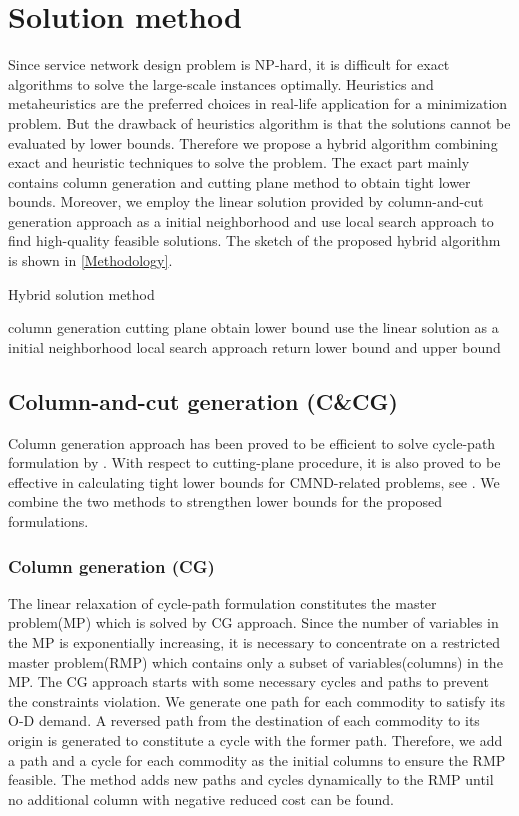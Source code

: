 \documentclass[11pt,nonblindrev,fleqn]{article}
\begin{document}
\section{Solution method}\label{method}
Since service network design problem is NP-hard, it is difficult for exact algorithms to solve the large-scale instances optimally. Heuristics and metaheuristics are the preferred choices in real-life application for a minimization problem. But the drawback of heuristics algorithm is that the solutions cannot be evaluated by lower bounds. Therefore we propose a hybrid algorithm combining exact and heuristic techniques to solve the problem. The exact part mainly contains column generation and cutting plane method to obtain tight lower bounds. Moreover, we employ the linear solution provided by column-and-cut generation approach as a initial neighborhood and use local search approach to find high-quality feasible solutions. The sketch of the proposed hybrid algorithm is shown in \autoref{Methodology}.

\vspace{.15in}
\begin{algorithm}[H]
\caption{Hybrid solution method}\label{Methodology}
\LinesNumbered
\SetNlSkip{1.2em}
{
    column generation\;
    cutting plane\;
}
obtain lower bound\;
use the linear solution as a initial neighborhood\;
local search approach\;
return lower bound and upper bound\;
\end{algorithm}
\subsection{Column-and-cut generation (C\&CG)}
Column generation approach has been proved to be efficient to solve cycle-path formulation by \cite{Andersen2011Branch}. With respect to cutting-plane procedure, it is also proved to be effective in calculating tight lower bounds for CMND-related problems, see \cite{Chouman2009Commodity,Chouman2016Commodity,Chouman2015Cutting}. We combine the two methods to strengthen lower bounds for the proposed formulations.

\subsubsection{Column generation (CG)}
The linear relaxation of cycle-path formulation constitutes the master problem(MP) which is solved by CG approach. Since the number of variables in the MP is exponentially increasing, it is necessary to concentrate on a restricted master problem(RMP) which contains only a subset of variables(columns) in the MP.  The CG approach starts with some necessary cycles and paths to prevent the constraints violation. We generate one path for each commodity to satisfy its O-D demand. A reversed path from the destination of each commodity to its origin is generated to constitute a cycle with the former path. Therefore, we add a path and a cycle for each commodity as the initial columns to ensure the RMP feasible. The method adds new paths and cycles dynamically to the RMP until no additional column with negative reduced cost can be found.
\end{document}
